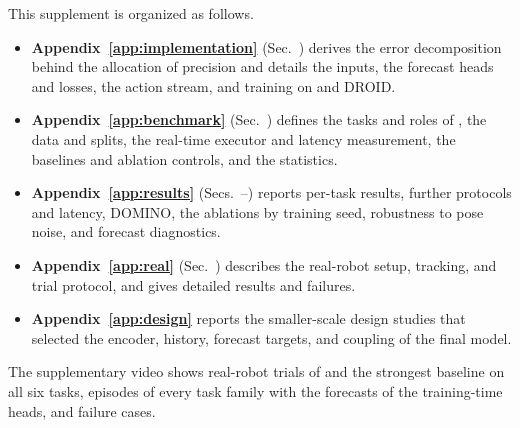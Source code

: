 This supplement is organized as follows.
\begin{itemize}\setlength{\itemsep}{1pt}\setlength{\topsep}{2pt}
\item \textbf{Appendix~\ref{app:implementation}} (Sec.~) derives the error
decomposition behind the allocation of precision and details the inputs, the forecast
heads and losses, the action stream, and training on \bench and DROID.
\item \textbf{Appendix~\ref{app:benchmark}} (Sec.~) defines the tasks and roles of
\bench, the data and splits, the real-time executor and latency measurement, the
baselines and ablation controls, and the statistics.
\item \textbf{Appendix~\ref{app:results}} (Secs.~--) reports per-task results,
further protocols and latency, DOMINO, the ablations by training seed, robustness to
pose noise, and forecast diagnostics.
\item \textbf{Appendix~\ref{app:real}} (Sec.~) describes the real-robot setup, tracking,
and trial protocol, and gives detailed results and failures.
\item \textbf{Appendix~\ref{app:design}} reports the smaller-scale design studies that selected the
encoder, history, forecast targets, and coupling of the final model.
\end{itemize}
The supplementary video shows real-robot trials of \ours and the strongest baseline on
all six tasks, \bench episodes of every task family with the forecasts of the
training-time heads, and failure cases.
